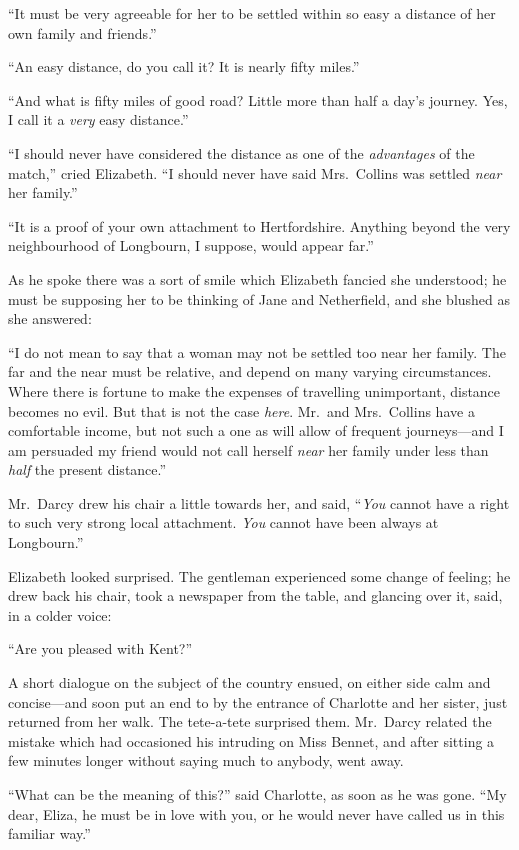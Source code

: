 ``It must be very agreeable for her to be settled within so easy a
distance of her own family and friends.''

``An easy distance, do you call it?  It is nearly fifty miles.''

``And what is fifty miles of good road?  Little more than half a
day's journey.  Yes, I call it a \emph{very} easy distance.''

``I should never have considered the distance as one of the
\emph{advantages} of the match,'' cried Elizabeth.  ``I should never
have said Mrs.\ Collins was settled \emph{near} her family.''

``It is a proof of your own attachment to Hertfordshire.
Anything beyond the very neighbourhood of Longbourn, I
suppose, would appear far.''

As he spoke there was a sort of smile which Elizabeth fancied
she understood; he must be supposing her to be thinking of Jane
and Netherfield, and she blushed as she answered:

``I do not mean to say that a woman may not be settled too near
her family.  The far and the near must be relative, and depend on
many varying circumstances.  Where there is fortune to make the
expenses of travelling unimportant, distance becomes no evil.
But that is not the case \emph{here}.  Mr.\ and Mrs.\ Collins have a
comfortable income, but not such a one as will allow of frequent
journeys---and I am persuaded my friend would not call herself
\emph{near} her family under less than \emph{half} the present distance.''

Mr.\ Darcy drew his chair a little towards her, and said, ``\emph{You}
cannot have a right to such very strong local attachment.
\emph{You} cannot have been always at Longbourn.''

Elizabeth looked surprised.  The gentleman experienced some
change of feeling; he drew back his chair, took a newspaper
from the table, and glancing over it, said, in a colder voice:

``Are you pleased with Kent?''

A short dialogue on the subject of the country ensued, on either
side calm and concise---and soon put an end to by the entrance
of Charlotte and her sister, just returned from her walk.  The
tete-a-tete surprised them.  Mr.\ Darcy related the mistake which
had occasioned his intruding on Miss Bennet, and after sitting a
few minutes longer without saying much to anybody, went away.

``What can be the meaning of this?'' said Charlotte, as soon as he
was gone.  ``My dear, Eliza, he must be in love with you, or he
would never have called us in this familiar way.''

